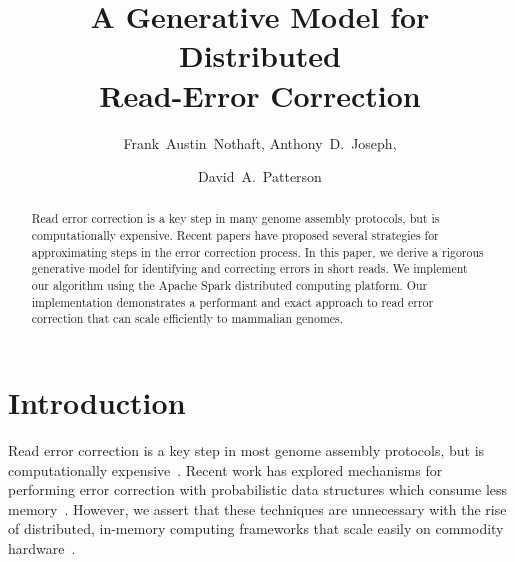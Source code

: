 \documentclass{llncs}
\begin{document}
%
\frontmatter          %
%
\pagestyle{headings}  %
\mainmatter              %
%
\title{A Generative Model for Distributed \\ Read-Error Correction}
%
%
\author{Frank~Austin~Nothaft, Anthony~D.~Joseph, \and David~A.~Patterson}
%
%

\maketitle              %

\begin{abstract}
Read error correction is a key step in many genome assembly protocols, but is computationally
expensive. Recent papers have proposed several strategies for approximating steps in the error
correction process. In this paper, we derive a rigorous generative model for identifying and correcting
errors in short reads. We implement our algorithm using the Apache Spark distributed computing
platform. Our implementation demonstrates a performant and exact approach to read error correction
that can scale efficiently to mammalian genomes.

\end{abstract}

\section{Introduction}
\label{sec:introduction}

Read error correction is a key step in most genome assembly protocols, but is computationally
expensive~\cite{kelley10}. Recent work has explored mechanisms for performing error correction with
probabilistic data structures which consume less memory~\cite{song14,shi10,liu13,heo14}. However,
we assert that these techniques are unnecessary with the rise of distributed, in-memory computing
frameworks that scale easily on commodity hardware~\cite{zaharia10}.
\end{document}
